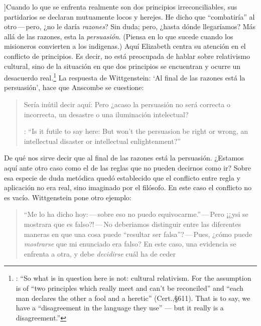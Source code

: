 ]{Cuando lo que se enfrenta realmente son dos principios irreconciliables, sus partidarios se declaran mutuamente locos y herejes. He dicho que ``combatiría'' al otro\,---\,pero, ¿no le daría \emph{razones}? Sin duda; pero, ¿hasta dónde llegaríamos? Más allá de las razones, esta la \emph{persuasión}. (Piensa en lo que sucede cuando los misioneros convierten a los indigenas.)} Aquí Elizabeth centra su atención en el conflicto de principios. Es decir, no está preocupada de hablar sobre relativismo cultural, sino de la situación en que dos principios se encuentran y ocurre un desacuerdo real.\footnote{\cite[Cf.~][131]{anscombe1981parmenides:qli}: \enquote{So what is in question here is not: cultural relativism. For the assumption is of ``two principles which really meet and can't be reconciled'' and ``each man declares the other a fool and a heretic'' (Cert.,\S611). That is to say, we have a ``disagreement in the language they use'' --- but it really is a disagreement.}} La respuesta de Wittgenstein: \enquote*{Al final de las razones está la persuasión}, hace que Anscombe se cuestione: \blockquote[{\cite{anscombe1981parmenides:qli}}: \enquote{Is it futile to say here: But won't the persuasion be right or wrong, an intellectual disaster or intellectual enlightenment?}]{Sería inútil decir aquí: Pero ¿acaso la persuasión no será correcta o incorrecta, un desastre o una iluminación intelectual?} De qué nos sirve decir que al final de las razones está la persuasión. ¿Estamos aquí ante otro caso como el de las reglas que no pueden decirnos como ir? Sobre esa especie de duda metódica quedó establecido que el conflicto entre regla y aplicación no era real, sino imaginado por el filósofo. En este caso el conflicto no es vacío. Wittgenstein pone otro ejemplo: \blockquote[{\cite[\S641]{wittgenstein1969oncertes}}
]{``Me lo ha dicho hoy:\,---\,sobre eso no puedo equivocarme.''\,---\,Pero ¡¿ysi se mostrara que es falso?!\,---\,No deberiamos distinguir entre las diferentes maneras en que una cosa puede ``resultar ser falsa''?\,---\,Pues, ¿cómo puede \emph{mostrarse} que mi enunciado era falso? En este caso, una evidencia se enfrenta a otra, y debe \emph{decidirse} cuál ha de ceder}.

